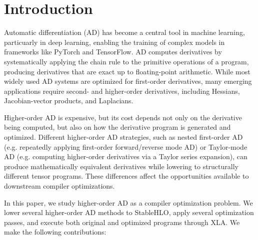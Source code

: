 \documentclass{article}
\theoremstyle{plain}
\theoremstyle{definition}
\theoremstyle{remark}
\begin{document}
\begin{abstract}
Higher-order automatic differentiation (AD) is increasingly important in
scientific machine learning, but mathematically equivalent methods for computing
Hessians, Hessian-vector products, and Laplacians can lower to substantially
different tensor programs.  We study this effect in JAX by comparing Hessian,
JVP-of-gradient, and Taylor-mode AD formulations, lowering each to StableHLO,
and dispatching both original and transformed programs through XLA.  Our
pipeline combines a direct tanh-MLP Laplacian rewrite with StableHLO constant
propagation and structural-zero elimination.  On MLP Laplacian and Poisson PINN
benchmarks, optimization reduces average runtime by up to \(1.94\times\) and
compile time by up to \(2.28\times\).  The fastest AD method before optimization
is not always the fastest after optimization, suggesting that higher-order AD
method selection should account for downstream compiler optimizability.
\end{abstract}

\section{Introduction}
Automatic differentiation (AD) has become a central tool in machine learning, particuarly in deep learning, enabling the training of complex models in frameworks like PyTorch and TensorFlow. AD computes derivatives by systematically applying the chain rule to the primitive operations of a program, producing derivatives that are exact up to floating-point arithmetic. While most widely used AD systems are optimized for first-order derivatives, many emerging applications require second- and higher-order derivatives, including Hessians, Jacobian-vector products, and Laplacians.

Higher-order AD is expensive, but its cost depends not only on the derivative being computed, but also on how the derivative program is generated and optimized. Different higher-order AD strategies, such as nested first-order AD (e.g. repeatedly applying first-order forward/reverse mode AD) or Taylor-mode AD (e.g. computing higher-order
derivatives via a Taylor series expansion), can produce mathematically equivalent derivatives while lowering to structurally different tensor programs. These differences affect the opportunities available to downstream compiler optimizations.

In this paper, we study higher-order AD as a compiler optimization problem. We lower several higher-order AD methods to StableHLO, apply several optimization passes, and execute both original and optimized programs through XLA. We make the following contributions:
\end{document}
